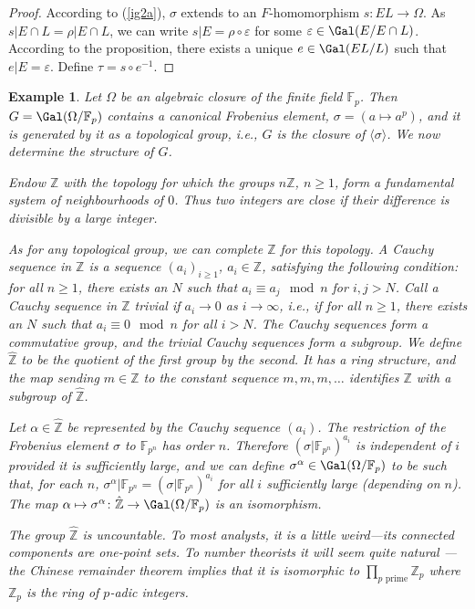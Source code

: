 \documentclass[a4paper,11pt,final,openany]{memoir}
\newtheorem{example}[X]{Example}
\theoremstyle{nonumberplain}
\newtheorem{proof}{Proof.}
\begin{document}
\begin{proof}
According to (\ref{ig2a}), $\sigma$ extends to an $F$-homomorphism $s\colon
EL\rightarrow\Omega$. As $s|E\cap L=\rho|E\cap L$, we can write $s|E=\rho
\circ\varepsilon$ for some $\varepsilon\in\Gal(E/E\cap L)$. According to the
proposition, there exists a unique $e\in\Gal(EL/L)$ such that $e|E=\varepsilon
$. Define $\tau=s\circ e^{-1}$.
\end{proof}

\begin{example}
\label{ig10}Let $\Omega$ be an algebraic closure of the finite field
$\mathbb{F}_{p}$. Then $G=\Gal(\Omega/\mathbb{F}_{p})$ contains a canonical
Frobenius element, $\sigma=(a\mapsto a^{p})$, and it is generated by it as a
topological group, i.e., $G$ is the closure of $\langle\sigma\rangle$. We now
determine the structure of $G$.

Endow $\mathbb{Z}$ with the topology for which the groups $n\mathbb{Z}$,
$n\geq1$, form a fundamental system of neighbourhoods of $0$. Thus two
integers are close if their difference is divisible by a large integer.

As for any topological group, we can complete $\mathbb{Z}$ for this topology.
A Cauchy sequence in $\mathbb{Z}$ is a sequence $(a_{i})_{i\geq1}$, $a_{i}%
\in\mathbb{Z}$, satisfying the following condition: for all $n\geq1$, there
exists an $N$ such that $a_{i}\equiv a_{j}\mod n$ for $i,j>N$. Call a Cauchy
sequence in $\mathbb{Z}$ trivial if $a_{i}\rightarrow0$ as $i\rightarrow
\infty$, i.e., if for all $n\geq1$, there exists an $N$ such that $a_{i}%
\equiv0\mod n$ for all $i>N$. The Cauchy sequences form a commutative group,
and the trivial Cauchy sequences form a subgroup. We define $\hat{\mathbb{Z}}$
to be the quotient of the first group by the second. It has a ring structure,
and the map sending $m\in\mathbb{Z}$ to the constant sequence $m,m,m,\ldots$
identifies $\mathbb{Z}$ with a subgroup of $\hat{\mathbb{Z}}$.

Let $\alpha\in\hat{\mathbb{Z}}$ be represented by the Cauchy sequence
$(a_{i})$. The restriction of the Frobenius element $\sigma$ to $\mathbb{F}%
_{p^{n}}$ has order $n$. Therefore $(\sigma|\mathbb{F}_{p^{n}})^{a_{i}}$ is
independent of $i$ provided it is sufficiently large, and we can define
$\sigma^{\alpha}\in\Gal(\Omega/\mathbb{F}_{p})$ to be such that, for each $n$,
$\sigma^{\alpha}|\mathbb{F}_{p^{n}}=(\sigma|\mathbb{F}_{p^{n}})^{a_{i}}$ for
all $i$ sufficiently large (depending on $n$). The map $\alpha\mapsto
\sigma^{\alpha}\colon\hat{\mathbb{Z}}\rightarrow\Gal(\Omega/\mathbb{F}_{p})$
is an isomorphism.

The group $\hat{\mathbb{Z}}$ is uncountable. To most analysts, it is a little
weird---its connected components are one-point sets. To number theorists it
will seem quite natural --- the Chinese remainder theorem implies that it is
isomorphic to $\prod_{p\text{\ prime}}\mathbb{Z}_{p}$ where $\mathbb{Z}_{p}$
is the ring of $p$-adic integers.
\end{example}
\end{document}
